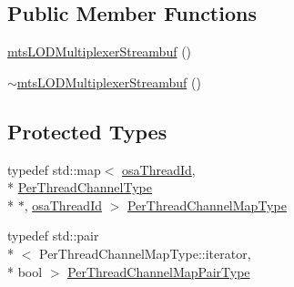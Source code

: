 \subsection*{Public Member Functions}
\begin{DoxyCompactItemize}
\item 
\hyperlink{classmts_l_o_d_multiplexer_streambuf_ac9e2888b131e809c18b29a863c064153}{mts\-L\-O\-D\-Multiplexer\-Streambuf} ()
\item 
\hyperlink{classmts_l_o_d_multiplexer_streambuf_aa4ed91024f1bcb4dc34481a3718cd7de}{$\sim$mts\-L\-O\-D\-Multiplexer\-Streambuf} ()
\end{DoxyCompactItemize}
\subsection*{Protected Types}
\begin{DoxyCompactItemize}
\item 
typedef std\-::map$<$ \hyperlink{classosa_thread_id}{osa\-Thread\-Id}, \\*
\hyperlink{classmts_l_o_d_multiplexer_streambuf_a945f4bdc4f4a79290018377ae3de68e9}{Per\-Thread\-Channel\-Type} \\*
$\ast$, \hyperlink{classosa_thread_id}{osa\-Thread\-Id} $>$ \hyperlink{classmts_l_o_d_multiplexer_streambuf_aff1696a1ada12cd77decfe1deb5d8a63}{Per\-Thread\-Channel\-Map\-Type}
\item 
typedef std\-::pair\\*
$<$ Per\-Thread\-Channel\-Map\-Type\-::iterator, \\*
bool $>$ \hyperlink{classmts_l_o_d_multiplexer_streambuf_aa6778f2331bcb1be3e4817612b97f42a}{Per\-Thread\-Channel\-Map\-Pair\-Type}
\end{DoxyCompactItemize}
